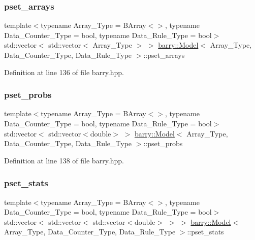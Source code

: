 \subsubsection{\texorpdfstring{pset\+\_\+arrays}{pset\_arrays}}
{\footnotesize\ttfamily template$<$typename Array\+\_\+\+Type  = B\+Array$<$$>$, typename Data\+\_\+\+Counter\+\_\+\+Type  = bool, typename Data\+\_\+\+Rule\+\_\+\+Type  = bool$>$ \\
std\+::vector$<$ std\+::vector$<$ Array\+\_\+\+Type $>$ $>$ \hyperlink{classbarry_1_1_model}{barry\+::\+Model}$<$ Array\+\_\+\+Type, Data\+\_\+\+Counter\+\_\+\+Type, Data\+\_\+\+Rule\+\_\+\+Type $>$\+::pset\+\_\+arrays}



Definition at line 136 of file barry.\+hpp.

\mbox{\label{classbarry_1_1_model_a4ccabb6842238fa5c7ff3476ef760423}} 
\subsubsection{\texorpdfstring{pset\+\_\+probs}{pset\_probs}}
{\footnotesize\ttfamily template$<$typename Array\+\_\+\+Type  = B\+Array$<$$>$, typename Data\+\_\+\+Counter\+\_\+\+Type  = bool, typename Data\+\_\+\+Rule\+\_\+\+Type  = bool$>$ \\
std\+::vector$<$ std\+::vector$<$double$>$ $>$ \hyperlink{classbarry_1_1_model}{barry\+::\+Model}$<$ Array\+\_\+\+Type, Data\+\_\+\+Counter\+\_\+\+Type, Data\+\_\+\+Rule\+\_\+\+Type $>$\+::pset\+\_\+probs}



Definition at line 138 of file barry.\+hpp.

\mbox{\label{classbarry_1_1_model_a3763f129965942611eb58e9779336f34}} 
\subsubsection{\texorpdfstring{pset\+\_\+stats}{pset\_stats}}
{\footnotesize\ttfamily template$<$typename Array\+\_\+\+Type  = B\+Array$<$$>$, typename Data\+\_\+\+Counter\+\_\+\+Type  = bool, typename Data\+\_\+\+Rule\+\_\+\+Type  = bool$>$ \\
std\+::vector$<$ std\+::vector$<$ std\+::vector$<$double$>$ $>$ $>$ \hyperlink{classbarry_1_1_model}{barry\+::\+Model}$<$ Array\+\_\+\+Type, Data\+\_\+\+Counter\+\_\+\+Type, Data\+\_\+\+Rule\+\_\+\+Type $>$\+::pset\+\_\+stats}




